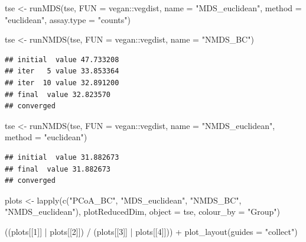 \documentclass[
]{book}
\newenvironment{Shaded}{\begin{snugshade}}{\end{snugshade}}
\newcommand{\AttributeTok}[1]{\textcolor[rgb]{0.77,0.63,0.00}{#1}}
\newcommand{\DecValTok}[1]{\textcolor[rgb]{0.00,0.00,0.81}{#1}}
\newcommand{\FunctionTok}[1]{\textcolor[rgb]{0.00,0.00,0.00}{#1}}
\newcommand{\NormalTok}[1]{#1}
\newcommand{\OtherTok}[1]{\textcolor[rgb]{0.56,0.35,0.01}{#1}}
\newcommand{\SpecialCharTok}[1]{\textcolor[rgb]{0.00,0.00,0.00}{#1}}
\newcommand{\StringTok}[1]{\textcolor[rgb]{0.31,0.60,0.02}{#1}}
\begin{document}
\begin{Shaded}
\begin{Highlighting}[]
\NormalTok{tse }\OtherTok{\textless{}{-}} \FunctionTok{runMDS}\NormalTok{(tse,}
              \AttributeTok{FUN =}\NormalTok{ vegan}\SpecialCharTok{::}\NormalTok{vegdist,}
              \AttributeTok{name =} \StringTok{"MDS\_euclidean"}\NormalTok{,}
              \AttributeTok{method =} \StringTok{"euclidean"}\NormalTok{,}
              \AttributeTok{assay.type =} \StringTok{"counts"}\NormalTok{)}

\NormalTok{tse }\OtherTok{\textless{}{-}} \FunctionTok{runNMDS}\NormalTok{(tse,}
               \AttributeTok{FUN =}\NormalTok{ vegan}\SpecialCharTok{::}\NormalTok{vegdist,}
               \AttributeTok{name =} \StringTok{"NMDS\_BC"}\NormalTok{)}
\end{Highlighting}
\end{Shaded}

\begin{verbatim}
## initial  value 47.733208 
## iter   5 value 33.853364
## iter  10 value 32.891200
## final  value 32.823570 
## converged
\end{verbatim}

\begin{Shaded}
\begin{Highlighting}[]
\NormalTok{tse }\OtherTok{\textless{}{-}} \FunctionTok{runNMDS}\NormalTok{(tse,}
               \AttributeTok{FUN =}\NormalTok{ vegan}\SpecialCharTok{::}\NormalTok{vegdist,}
               \AttributeTok{name =} \StringTok{"NMDS\_euclidean"}\NormalTok{,}
               \AttributeTok{method =} \StringTok{"euclidean"}\NormalTok{)}
\end{Highlighting}
\end{Shaded}

\begin{verbatim}
## initial  value 31.882673 
## final  value 31.882673 
## converged
\end{verbatim}

\begin{Shaded}
\begin{Highlighting}[]
\NormalTok{plots }\OtherTok{\textless{}{-}} \FunctionTok{lapply}\NormalTok{(}\FunctionTok{c}\NormalTok{(}\StringTok{"PCoA\_BC"}\NormalTok{, }\StringTok{"MDS\_euclidean"}\NormalTok{, }\StringTok{"NMDS\_BC"}\NormalTok{, }\StringTok{"NMDS\_euclidean"}\NormalTok{),}
\NormalTok{                plotReducedDim,}
                \AttributeTok{object =}\NormalTok{ tse,}
                \AttributeTok{colour\_by =} \StringTok{"Group"}\NormalTok{)}

\NormalTok{((plots[[}\DecValTok{1}\NormalTok{]] }\SpecialCharTok{|}\NormalTok{ plots[[}\DecValTok{2}\NormalTok{]]) }\SpecialCharTok{/}\NormalTok{ (plots[[}\DecValTok{3}\NormalTok{]] }\SpecialCharTok{|}\NormalTok{ plots[[}\DecValTok{4}\NormalTok{]])) }\SpecialCharTok{+}
  \FunctionTok{plot\_layout}\NormalTok{(}\AttributeTok{guides =} \StringTok{"collect"}\NormalTok{)}
\end{Highlighting}
\end{Shaded}
\end{document}
